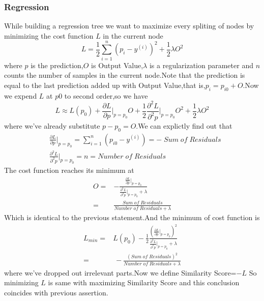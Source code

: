 \documentclass{article}
\begin{document}
\subsubsection{Regression}
While building a regression tree we want to maximize every spliting of nodes by minimizing the cost function $L$ in the current node $$L=\frac{1}{2}\sum_{i=1}^{n}(p_i-y^{(i)})^2+\frac{1}{2}\lambda O^2$$where $p$ is the prediction,$O$ is Output Value,$\lambda$ is a regularization parameter and $n$ counts the number of samples in the current node.Note that the prediction is equal to the last prediction added up with Output Value,that is,$p_i=p_{i0}+O$.Now we expend $L$ at $p0$ to second order,so we have$$L\approx L(p_0)+\frac{\partial L}{\partial p}\Big|_{p=p_0}O+\frac{1}{2}\frac{\partial^2 L}{\partial^2 p}\Big|_{p=p_0}O^2+\frac{1}{2}\lambda O^2$$where we've already substitute $p-p_0=O$.We can explictly find out that
\begin{align*}
	&\frac{\partial L}{\partial p}\Big|_{p=p_0}=\sum_{i=1}^{n}(p_{i0}-y^{(i)})=-\;Sum\;of\;Residuals\\
	&\frac{\partial^2 L}{\partial^2 p}\Big|_{p=p_0}=n=Number\;of\;Residuals
\end{align*}
The cost function reaches its minimum at
\begin{align*}
	O=&-\frac{\frac{\partial L}{\partial p}\Big|_{p=p_0}}{\frac{\partial^2 L}{\partial^2 p}\Big|_{p=p_0}+\lambda}\\=&\frac{Sum\;of\;Residuals}{Number\;of\;Residuals+\lambda}
\end{align*}
Which is identical to the previous statement.And the minimum of cost function is
\begin{align*}
	L_{min}=&L(p_0)-\frac{1}{2}\frac{(\frac{\partial L}{\partial p}\Big|_{p=p_0})^2}{\frac{\partial^2 L}{\partial^2 p}\Big|_{p=p_0}+\lambda}\\=&~-\frac{(Sum\;of\;Residuals)^2}{Number\;of\;Residuals+\lambda}
\end{align*}
where we've dropped out irrelevant parts.Now we define Similarity Score=$-L$ So minimizing $L$ is same with maximizing Similarity Score and this conclusion coincides with previous assertion.
\end{document}
